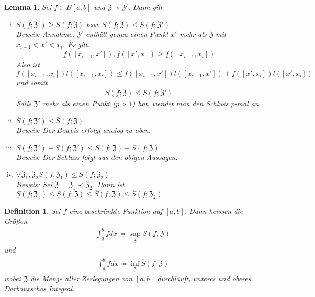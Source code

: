 \documentclass[ngerman,titlepage,twoside, parskip=half*]{scrreprt}
\newcommand*{\ZZ}{\mathfrak{Z}}
\theoremstyle{break}
\newtheorem{lemma}{Lemma}
\newtheorem{definition}{Definition}[chapter]
\theoremstyle{nonumberbreak}
\begin{document}
\begin{lemma}
  \label{lemma:int}
  Sei $f\in B[a,b]$ und $\ZZ\prec \ZZ'$. Dann gilt
  \begin{enumerate}[(i)]
    \item $\underline{S}(f;\ZZ')\geq \underline{S}(f;\ZZ)$
      bzw. $\underline{S}(f;\ZZ) \leq \underline{S}(f; \ZZ')$\\
      \textit{Beweis}: Annahme: $\ZZ'$ enthält genau einen Punkt $x'$ mehr
      als $\ZZ$ mit $x_{i-1}<x'<x_i$. Es gilt:
      \begin{gather*}\underline{f}([x_{i-1},x']),\underline{f}([x',x])\geq \underline{f}
      ([x_{i-1},x_i])\end{gather*}
      Also ist $\underline{f}([x_{i-1},x_i])l([x_{i-1},x_i])\leq 
      \underline{f}([x_{i-1},x'])l([x_{i-1},x'])+\underline{f}([x',x_i])
      l([x',x_i])$ und somit
      \begin{gather*}\underline{S}(f;\ZZ)\leq \underline{S}(f;\ZZ')\end{gather*}
      Falls $\ZZ'$ mehr als einen Punkt ($p>1$) hat, wendet man den Schluss
      $p$-mal an.
    \item $\overline{S}(f;\ZZ')\leq \overline{S}(f;\ZZ)$\\
      \textit{Beweis}: Der Beweis erfolgt analog zu oben.
    \item $\overline{S}(f;\ZZ')-\underline{S}(f;\ZZ')\leq \overline{S}(f;\ZZ)
      -\overline{S}(f;\ZZ)$\\
      \textit{Beweis}: Der Schluss folgt aus den obigen Aussagen.
    \item $\forall \ZZ_1,\ZZ_2 \underline{S}(f;\ZZ_1)\leq \overline{S}
      (f;\ZZ_2)$\\
      \textit{Beweis}: Sei $\ZZ=\ZZ_1\prec \ZZ_2$. Dann ist $\underline{S}
      (f;\ZZ_1)\leq \underline{S}(f;\ZZ)\leq \overline{S}(f;\ZZ)\leq
      \overline{S}(f;\ZZ_2)$
  \end{enumerate}
\end{lemma}

\begin{definition}
  Sei $f$ eine beschränkte Funktion auf $[a,b]$. Dann heissen die Größen
  \begin{gather*}\int_{\underline{a}}^b fdx \coloneqq \sup_\ZZ \underline{S}(f;\ZZ)\end{gather*}
  und
  \begin{gather*}\int_a^{\overline{b}} fdx \coloneqq \inf_\ZZ \overline{S}(f;\ZZ)\end{gather*}
  wobei $\ZZ$ die Menge aller Zerlegungen von $[a,b]$ durchläuft, unteres
  und oberes \emph{Darbouxsches Integral}.
\end{definition}
\end{document}
